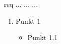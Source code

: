 \begin{environment}[opt]{req}
...
...
...
\end{environment}
\begin{enumerate}
	\item Punkt 1
	\begin{itemize}
		\item Punkt 1.1
	\end{itemize}
\end{enumerate}

